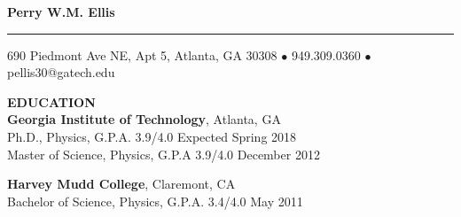 \documentclass[10pt]{article}
\newcommand{\HRule}{\rule{\linewidth}{0.5mm}}
\newenvironment{changemargin}[2]{%
  \list{}{\rightmargin#2\leftmargin#1
    \parsep=0pt\topsep=1pt\partopsep=0pt}
\item[]} {\endlist}
\newenvironment{indentmore}{\begin{changemargin}{10pt}{0cm}}{\end{changemargin}}
\begin{document}
\begin{center}

\textbf{\Large Perry W.M. Ellis}
\HRule

690 Piedmont Ave NE, Apt 5, Atlanta, GA 30308 $\bullet$ 949.309.0360 $\bullet$ pellis30@gatech.edu

\end{center}


\vspace{10pt}
\textbf{\large EDUCATION} \\
\textbf{Georgia Institute of Technology}, Atlanta, GA\\
\hspace*{10pt}Ph.D., Physics, G.P.A. 3.9/4.0 \hfill Expected Spring 2018\\
\hspace*{10pt}Master of Science, Physics, G.P.A 3.9/4.0 \hfill December 2012

\vspace{10pt}

\textbf{Harvey Mudd College}, Claremont, CA \\
\hspace*{10pt}Bachelor of Science, Physics, G.P.A. 3.4/4.0 \hfill May 2011
\end{document}
